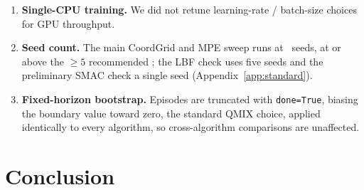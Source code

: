 \begin{enumerate}[leftmargin=*,itemsep=0pt,topsep=2pt]
        was run at a single (150k) budget, so we cannot rule out that either
        mechanism routes with more training; and it is one constructed relay
        task. Whether message passing separates from payoff propagation on
        genuine multi-hop routing, and at what budget, remains open.
  \item \textbf{Single-CPU training.} We did not retune learning-rate /
        batch-size choices for GPU throughput.
  \item \textbf{Seed count.} The main CoordGrid and MPE sweep runs at
        \PEseeds\ seeds, at or above the $\ge 5$ recommended
        \citep{henderson_2018_drlmatters,agarwal_2021_precipice}; the LBF
        check uses five seeds and the preliminary SMAC check a single seed
        (Appendix~\ref{app:standard}).
  \item \textbf{Fixed-horizon bootstrap.} Episodes are truncated with
        \texttt{done=True}, biasing the boundary value toward zero, the
        standard QMIX choice, applied identically to every algorithm, so
        cross-algorithm comparisons are unaffected.
\end{enumerate}

\section{Conclusion}
\label{sec:conclusion}

